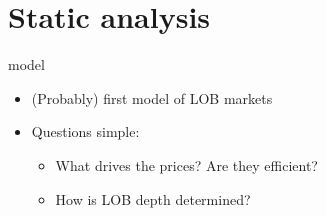 \documentclass[english,10pt
,aspectratio=169
]{beamer}
\begin{document}



\section{Static analysis}

\begin{frame}{\cite{glosten_is_1994} model}
	\begin{itemize}
		\item (Probably) first model of LOB markets
		\item Questions simple:
		\begin{itemize}
			\item What drives the prices? Are they efficient?
			\item How is LOB depth determined?
		\end{itemize}
	\end{itemize}
\end{frame}
\end{document}
